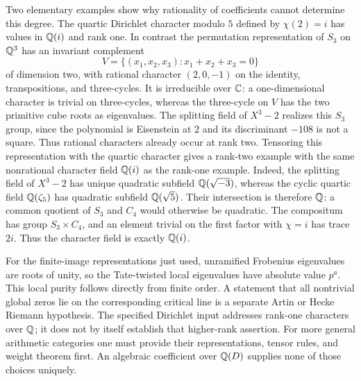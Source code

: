 Two elementary examples show why rationality of coefficients cannot determine this degree. The quartic Dirichlet character modulo $5$ defined by $\chi(2)=i$ has values in $\mathbb Q(i)$ and rank one. In contrast the permutation representation of $S_3$ on $\mathbb Q^3$ has an invariant complement
\[
 V=\{(x_1,x_2,x_3):x_1+x_2+x_3=0\}
\]
of dimension two, with rational character $(2,0,-1)$ on the identity, transpositions, and three-cycles. It is irreducible over $\mathbb C$: a one-dimensional character is trivial on three-cycles, whereas the three-cycle on $V$ has the two primitive cube roots as eigenvalues. The splitting field of $X^3-2$ realizes this $S_3$ group, since the polynomial is Eisenstein at $2$ and its discriminant $-108$ is not a square. Thus rational characters already occur at rank two. Tensoring this representation with the quartic character gives a rank-two example with the same nonrational character field $\mathbb Q(i)$ as the rank-one example. Indeed, the splitting field of $X^3-2$ has unique quadratic subfield $\mathbb Q(\sqrt{-3})$, whereas the cyclic quartic field $\mathbb Q(\zeta_5)$ has quadratic subfield $\mathbb Q(\sqrt5)$. Their intersection is therefore $\mathbb Q$: a common quotient of $S_3$ and $C_4$ would otherwise be quadratic. The compositum has group $S_3\times C_4$, and an element trivial on the first factor with $\chi=i$ has trace $2i$. Thus the character field is exactly $\mathbb Q(i)$.

For the finite-image representations just used, unramified Frobenius eigenvalues are roots of unity, so the Tate-twisted local eigenvalues have absolute value $p^a$. This local purity follows directly from finite order. A statement that all nontrivial global zeros lie on the corresponding critical line is a separate Artin or Hecke Riemann hypothesis. The specified Dirichlet input addresses rank-one characters over $\mathbb Q$; it does not by itself establish that higher-rank assertion. For more general arithmetic categories one must provide their representations, tensor rules, and weight theorem first. An algebraic coefficient over $\mathbb Q(D)$ supplies none of those choices uniquely.
